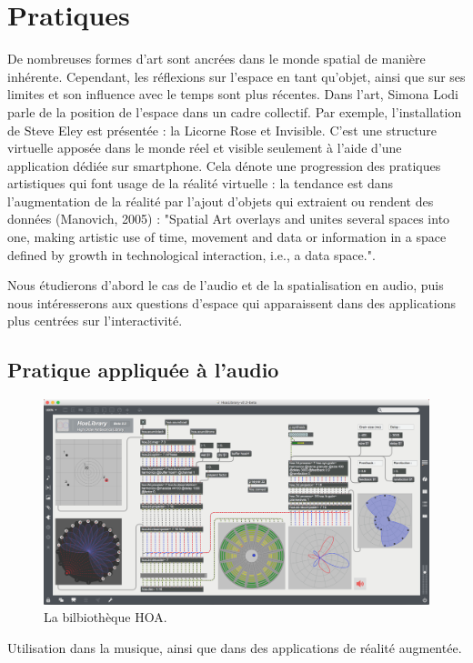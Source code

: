 \documentclass[french,12pt]{article}
\begin{document}
\section{Pratiques}
De nombreuses formes d'art sont ancrées dans le monde spatial de manière inhérente. 
Cependant, les réflexions sur l'espace en tant qu'objet, ainsi que sur ses limites et son influence avec le temps sont plus récentes. Dans l'art, Simona Lodi parle de la position de l'espace dans un cadre collectif\cite{lodi_spatial_2014}. Par exemple, l'installation de Steve Eley est présentée : la Licorne Rose et Invisible. C'est une structure virtuelle apposée dans le monde réel et visible seulement à l'aide d'une application dédiée sur smartphone. Cela dénote une progression des pratiques artistiques qui font usage de la réalité virtuelle : la tendance est dans l'augmentation de la réalité par l'ajout d'objets qui extraient ou rendent des données (Manovich, 2005) : "Spatial Art overlays and unites several spaces into one, making artistic use of time, movement and data or information in a space defined by growth in technological interaction, i.e., a data space.".

Nous étudierons d'abord le cas de l'audio et de la spatialisation en audio, puis nous intéresserons aux questions d'espace qui apparaissent dans des applications plus centrées sur l'interactivité.

\subsection{Pratique appliquée à l'audio}
\begin{figure}[h]
    \centering
    \includegraphics[scale=0.25]{images/hoalibrary.png}
    \caption{La bilbiothèque HOA.}
    \label{fig.hoalib}
\end{figure}

Utilisation dans la musique, ainsi que dans des applications de réalité augmentée.
\end{document}
